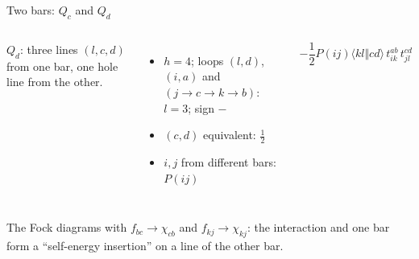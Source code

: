 \documentclass[aspectratio=169,10pt]{beamer}
\newcommand{\as}[4]{\langle #1#2\Vert #3#4\rangle}
\begin{document}
\begin{frame}[shrink=10]{Two bars: $Q_c$ and $Q_d$}
\begin{columns}[T]
\vspace{0.5em}
\raggedright
$Q_d$: three lines $(l,c,d)$ from one bar, one hole line from the other.
\begin{itemize}
\item $h=4$; loops $(l,d)$, $(i,a)$ and $(j\!\to\!c\!\to\!k\!\to\!b)$: $l=3$; sign $-$
\item $(c,d)$ equivalent: $\tfrac12$
\item $i,j$ from different bars: $P(ij)$
\end{itemize}
\[
 -\frac12P(ij)\as klcd\,t_{ik}^{ab}\,t_{jl}^{cd}
\]
\end{columns}
\vspace{0.3em}
The Fock diagrams with $f_{bc}\to\chi_{cb}$ and $f_{kj}\to\chi_{kj}$: the interaction and one bar form a ``self-energy insertion'' on a line of the other bar.
\end{frame}
\end{document}
